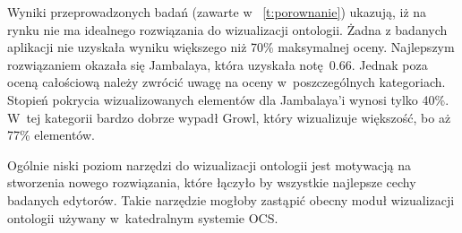 % 
% 
% 
% 
% 
% 
% 
% 
% 
% 
% 
% 
% 




Wyniki przeprowadzonych badań (zawarte w  \tablename~\ref{t:porownanie}) ukazują, iż na rynku nie ma idealnego rozwiązania do wizualizacji ontologii. 
Żadna z badanych aplikacji nie uzyskała wyniku większego niż 70\% maksymalnej oceny.  Najlepszym rozwiązaniem okazała się Jambalaya, która uzyskała 
notę~0.66. Jednak poza oceną całościową należy zwrócić uwagę na oceny w~poszczególnych kategoriach. Stopień pokrycia 
wizualizowanych elementów dla Jambalaya'i wynosi tylko 40\%. W~tej kategorii bardzo dobrze wypadł Growl, który wizualizuje większość, bo aż 77\% elementów.
\par Ogólnie niski poziom narzędzi do wizualizacji ontologii jest motywacją na stworzenia nowego rozwiązania, które łączyło by wszystkie najlepsze cechy
 badanych edytorów. Takie narzędzie mogłoby zastąpić obecny moduł wizualizacji ontologii używany w~katedralnym systemie OCS. 


